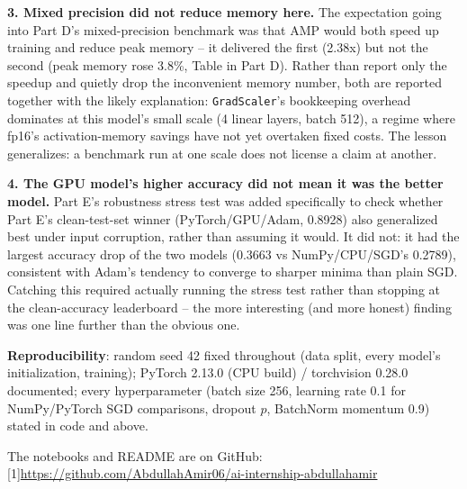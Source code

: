 \documentclass[11pt,a4paper]{article}
\begin{document}
\textbf{3. Mixed precision did not reduce memory here.} The expectation going into Part D's
mixed-precision benchmark was that AMP would both speed up training and reduce peak memory --
it delivered the first (2.38x) but not the second (peak memory rose 3.8\%, Table in Part D).
Rather than report only the speedup and quietly drop the inconvenient memory number, both are
reported together with the likely explanation: \texttt{GradScaler}'s bookkeeping overhead
dominates at this model's small scale (4 linear layers, batch 512), a regime where fp16's
activation-memory savings have not yet overtaken fixed costs. The lesson generalizes: a
benchmark run at one scale does not license a claim at another.

\textbf{4. The GPU model's higher accuracy did not mean it was the better model.} Part E's
robustness stress test was added specifically to check whether Part E's clean-test-set winner
(PyTorch/GPU/Adam, 0.8928) also generalized best under input corruption, rather than assuming it
would. It did not: it had the largest accuracy drop of the two models (0.3663 vs NumPy/CPU/SGD's
0.2789), consistent with Adam's tendency to converge to sharper minima than plain SGD. Catching
this required actually running the stress test rather than stopping at the clean-accuracy
leaderboard -- the more interesting (and more honest) finding was one line further than the
obvious one.

\textbf{Reproducibility}: random seed 42 fixed throughout (data split, every model's
initialization, training); PyTorch 2.13.0 (CPU build) / torchvision 0.28.0 documented; every
hyperparameter (batch size 256, learning rate 0.1 for NumPy/PyTorch SGD comparisons, dropout
$p$, BatchNorm momentum 0.9) stated in code and above.

\vspace{0.4cm}
\noindent The notebooks and README are on GitHub: {\small\scalebox{0.72}[1]{\url{https://github.com/AbdullahAmir06/ai-internship-abdullahamir}}}
\end{document}
